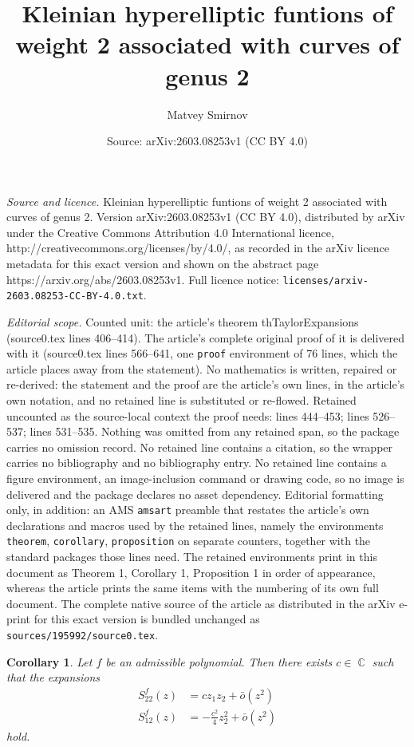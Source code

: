 \documentclass[10pt,a4paper]{amsart}
\title{Kleinian hyperelliptic funtions of weight 2 associated with curves of genus 2}
\author{Matvey Smirnov}
\date{Source: arXiv:2603.08253v1 (CC BY 4.0)}
\newtheorem{corollary}{Corollary}
\DeclareMathOperator{\CC}{\mathbb C}
\begin{document}
\maketitle

\noindent\emph{Source and licence.} Kleinian hyperelliptic funtions of weight 2 associated with curves of genus 2. Version arXiv:2603.08253v1 (CC BY 4.0), distributed by arXiv under the Creative Commons Attribution 4.0 International licence, http://creativecommons.org/licenses/by/4.0/, as recorded in the arXiv licence metadata for this exact version and shown on the abstract page https://arxiv.org/abs/2603.08253v1. Full licence notice: \texttt{licenses/arxiv-2603.08253-CC-BY-4.0.txt}.\par\smallskip

\noindent\textit{Editorial scope.} Counted unit: the article's theorem thTaylorExpansions (source0.tex lines 406--414). The article's complete original proof of it is delivered with it (source0.tex lines 566--641, one \texttt{proof} environment of 76 lines, which the article places away from the statement). No mathematics is written, repaired or re-derived: the statement and the proof are the article's own lines, in the article's own notation, and no retained line is substituted or re-flowed.  Retained uncounted as the source-local context the proof needs: lines 444--453; lines 526--537; lines 531--535.  Nothing was omitted from any retained span, so the package carries no omission record.  No retained line contains a citation, so the wrapper carries no bibliography and no bibliography entry.  No retained line contains a figure environment, an image-inclusion command or drawing code, so no image is delivered and the package declares no asset dependency.  Editorial formatting only, in addition: an AMS \texttt{amsart} preamble that restates the article's own declarations and macros used by the retained lines, namely the environments \texttt{theorem}, \texttt{corollary}, \texttt{proposition} on separate counters, together with the standard packages those lines need.  The retained environments print in this document as Theorem 1, Corollary 1, Proposition 1 in order of appearance, whereas the article prints the same items with the numbering of its own full document.  The complete native source of the article as distributed in the arXiv e-print for this exact version is bundled unchanged as \texttt{sources/195992/source0.tex}.
	\begin{corollary}\label{corPartialExpansions}
		Let $f$ be an admissible polynomial. Then there exists $c \in \CC$ such that the expansions
		\begin{equation}\label{eqSP12and22expansion}
			\begin{split}
				S_{22}^f(z) & =  cz_1z_2 + \bar{o}(z^2) \\
				S_{12}^f(z) & =  -\frac{c^2}{4}z_2^2 + \bar{o}(z^2)
			\end{split}
		\end{equation}
		hold.
	\end{corollary}
\end{document}
